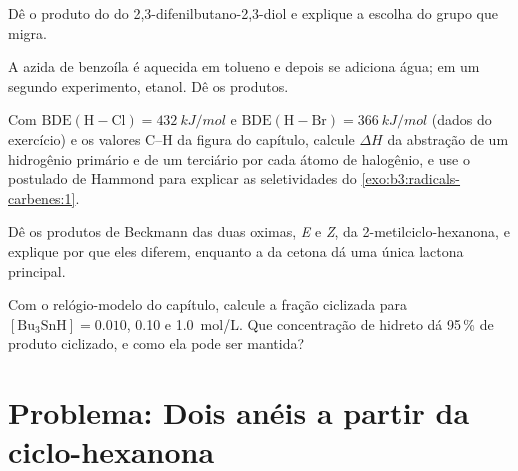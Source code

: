 \begin{exercise}[$\star\star$]\label{exo:b3:radicals-carbenes:8}
Dê o produto do  do 2,3-difenilbutano-2,3-diol
e explique a escolha do grupo que migra.
\end{exercise}

\begin{exercise}[$\star\star$]\label{exo:b3:radicals-carbenes:9}
A azida de benzoíla é aquecida em tolueno e depois se adiciona água; em um segundo experimento,
etanol. Dê os produtos.
\end{exercise}

\begin{exercise}[$\star\star\star$]\label{exo:b3:radicals-carbenes:10}
Com $\mathrm{BDE(H{-}Cl)} = \qty{432}{kJ/mol}$ e $\mathrm{BDE(H{-}Br)} = \qty{366}{kJ/mol}$ (dados do exercício) e os valores C--H da
figura do capítulo, calcule $\Delta H$ da abstração de um hidrogênio primário e de um terciário
por cada átomo de halogênio, e use o postulado de Hammond para explicar as
seletividades do \cref{exo:b3:radicals-carbenes:1}.
\end{exercise}

\begin{exercise}[$\star\star\star$]\label{exo:b3:radicals-carbenes:11}
Dê os produtos de Beckmann das duas oximas, \textit{E} e \textit{Z}, da 2-metilciclo-hexanona,
e explique por que eles diferem, enquanto a  da
cetona dá uma única lactona principal.
\end{exercise}

\begin{exercise}[$\star\star\star$]\label{exo:b3:radicals-carbenes:12}
Com o relógio-modelo do capítulo, calcule a fração ciclizada para $[\mathrm{Bu_3SnH}] = 0.010$,
0.10 e \qty{1.0}{mol/L}. Que concentração de hidreto dá 95\,\% de produto ciclizado, e como
ela pode ser mantida?
\end{exercise}

\section{Problema: Dois anéis a partir da ciclo-hexanona}

